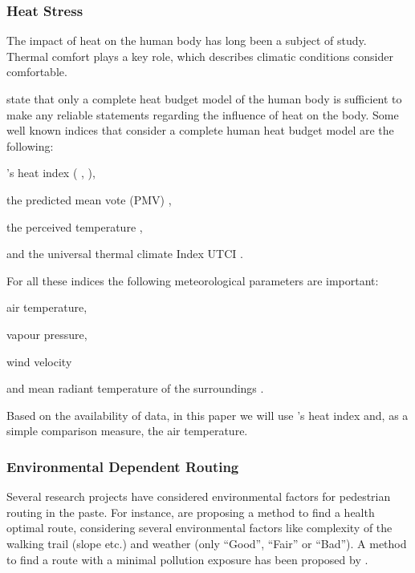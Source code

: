 \subsubsection{Heat Stress}
The impact of heat on the human body has long been a subject of study. Thermal comfort plays a key role, which describes climatic conditions consider comfortable. 

\textcite{Staiger1997} state that only a complete heat budget model of the human body is sufficient to make any reliable statements regarding the influence of heat on the body. Some well known indices that consider a complete human heat budget model are the following:
\begin{inparaenum}[(1)]
  \item \citeauthor{Steadman1979}'s heat index (\citeauthor{Steadman1979} \citeyear*{Steadman1979}, \citeyear*{Steadman1979a}),
  \item the predicted mean vote (PMV) \parencite{Fanger1973},
  \item the perceived temperature \parencite{Staiger1997,Jendritzky2000},
  \item and the universal thermal climate Index UTCI \parencite{Jendritzky2010}.
\end{inparaenum}

For all these indices the following meteorological parameters are important:
\begin{inparaenum}[(1)]
\item air temperature,
\item vapour pressure,
\item wind velocity 
\item and mean radiant temperature of the surroundings \parencite{Matzarakis1999}.
\end{inparaenum}

Based on the availability of data, in this paper we will use \citeauthor{Steadman1979}'s heat index \parencite{Steadman1979} and, as a simple comparison measure, the air temperature.

\subsubsection{Environmental Dependent Routing}
Several research projects have considered environmental factors for pedestrian routing in the paste. For instance, \textcite{Sharker2012} are proposing a method to find a health optimal route, considering several environmental factors like complexity of the walking trail (slope etc.) and weather (only “Good”, “Fair” or “Bad”). A method to find a route with a minimal pollution exposure has been proposed by \textcite{Hasenfratz2015}.

